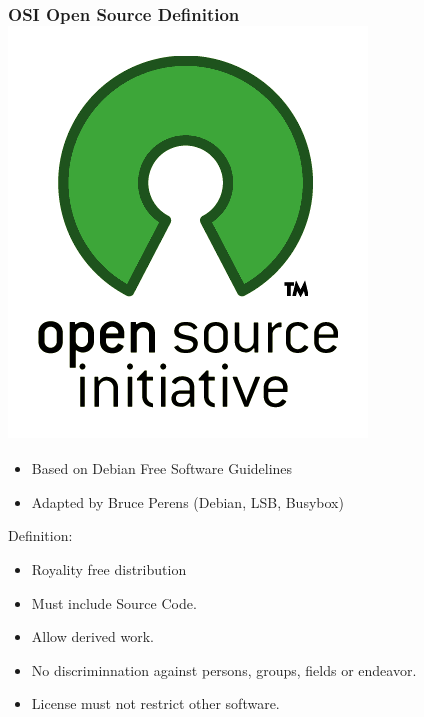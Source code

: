 \documentclass[hyperref={pdfpagelabels=false},xcolor=pst,pdf,fragile]{beamer}
\begin{document}
\begin{frame}
  \frametitle{OSI Open Source Definition \includegraphics[scale=0.07]{img/osi_standard_logo.png}}

  \begin{itemize}
	\item Based on Debian Free Software Guidelines
	\item Adapted by Bruce Perens (Debian, LSB, Busybox)
  \end{itemize}

  \pause

  Definition:
  \begin{itemize}
	\item Royality free distribution
	\item Must include Source Code.
	\item Allow derived work.
	\item No discriminnation against persons, groups, fields or endeavor.
	\item License must not restrict other software.
  \end{itemize}

\end{frame}
\end{document}
